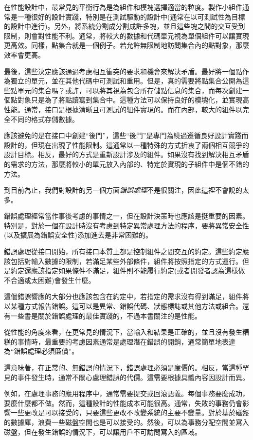 在性能設計中，最常見的平衡行為是為組件和模塊選擇適當的粒度。製作小組件通常是一種很好的設計實踐，特別是在測試驅動的設計中(通常在以可測試性為目標的設計中進行)。另外，將系統分割成分割成許多塊，並且這些塊之間的交互受到限制，則會對性能不利。通常，將較大的數據和代碼單元視為單個組件可以讓實現更高效。同樣，點集合就是一個例子。若允許無限制地訪問集合內的點對象，那麼效率會更高。 

最後，這些決定應該通過考慮相互衝突的要求和機會來解決矛盾。最好將一個點作為獨立的單元，並在其他代碼中可測試和重用。但是，真的需要將點集合公開為這些點單元的集合嗎？或許，可以將其視為包含所存儲點信息的集合，而每次創建一個點對象只是為了將點讀寫到集合中。這種方法可以保持良好的模塊化，並實現高性能。通常，接口是根據清晰且可測試的組件實現的。而在內部，較大的組件以完全不同的格式存儲數據。 

應該避免的是在接口中創建“後門”，這些“後門”是專門為繞過遵循良好設計實踐而設計的，但現在出現了性能限制。這通常以一種特殊的方式折衷了兩個相互競爭的設計目標。相反，最好的方式是重新設計涉及的組件。如果沒有找到解決相互矛盾的需求的方法，那麼將較小的單元放入內部的、特定於實現的子組件中是個不錯的方法。

到目前為止，我們對設計的另一個方面\textit{錯誤處理}不是很關注，因此這裡不會說的太多。


錯誤處理經常當作事後考慮的事情之一，但在設計決策時也應該是挺重要的因素。特別是，對於一個在設計時沒有考慮到特定異常處理方法的程序，要將異常安全性(以及擴展為錯誤安全性)添加進去是非常困難的。

錯誤處理從接口開始，所有接口本質上都是控制組件之間交互的約定。這些約定應該包括對輸入數據的限制，若滿足某些外部條件，組件將按照指定的方式運行。但是約定還應該指定如果條件不滿足，組件則不能履行約定(或者開發者認為這樣做不合適或太困難)會發生什麼。 

這個錯誤響應的大部分也應該包含在約定中，若指定的需求沒有得到滿足，組件將以某種方式報告錯誤。這可以是異常、錯誤代碼、狀態標誌或其他方法或組合。還有一些書是關於錯誤處理的最佳實踐的，不過本書關注的是性能。

從性能的角度來看，在更常見的情況下，當輸入和結果是正確的，並且沒有發生糟糕的事情時，最重要的考慮因素通常是處理潛在錯誤的開銷，通常簡單地表達為“錯誤處理必須廉價”。

這意味著，在正常的、無錯誤的情況下，錯誤處理必須是廉價的。相反，當這種罕見的事件發生時，通常不關心處理錯誤的代價。這需要根據具體內容因設計而異。 

例如，在處理事務的應用程序中，通常需要提交或回滾語義。每個事務要麼成功，要麼什麼都不做。然而，這種設計的性能成本可能很高。通常，失敗的事務仍會影響一些更改是可以接受的，只要這些更改不改變系統的主要不變量。對於基於磁盤的數據庫，浪費一些磁盤空間也是可以接受的。然後，可以為事務分配空間並寫入磁盤，但在發生錯誤的情況下，可以讓用戶不可訪問寫入的區域。

